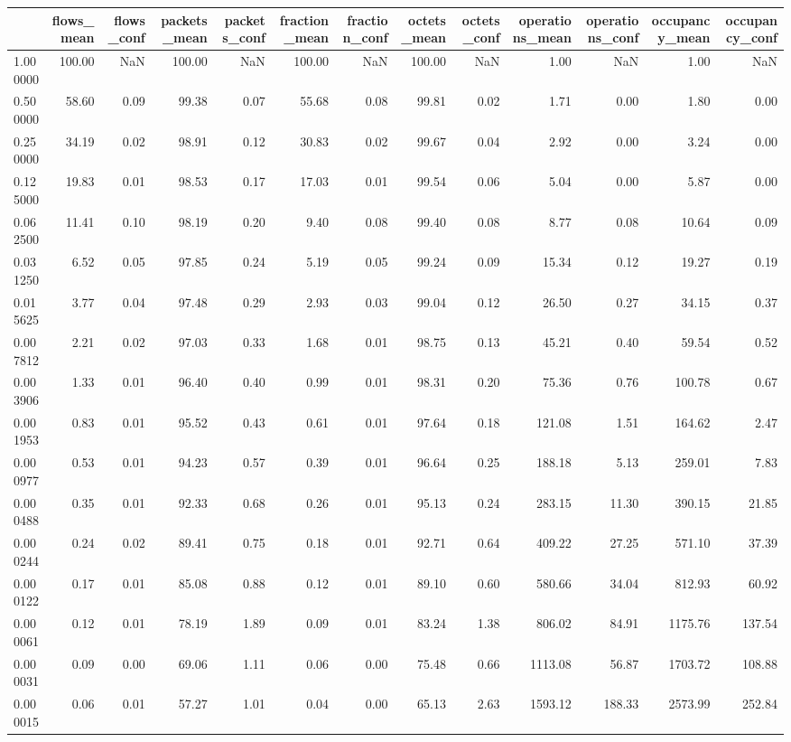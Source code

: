 \begin{tabular}{lrrrrrrrrrrrr}
\toprule
 & flows_mean & flows_conf & packets_mean & packets_conf & fraction_mean & fraction_conf & octets_mean & octets_conf & operations_mean & operations_conf & occupancy_mean & occupancy_conf \\
\midrule
1.000000 & 100.00 & NaN & 100.00 & NaN & 100.00 & NaN & 100.00 & NaN & 1.00 & NaN & 1.00 & NaN \\
0.500000 & 58.60 & 0.09 & 99.38 & 0.07 & 55.68 & 0.08 & 99.81 & 0.02 & 1.71 & 0.00 & 1.80 & 0.00 \\
0.250000 & 34.19 & 0.02 & 98.91 & 0.12 & 30.83 & 0.02 & 99.67 & 0.04 & 2.92 & 0.00 & 3.24 & 0.00 \\
0.125000 & 19.83 & 0.01 & 98.53 & 0.17 & 17.03 & 0.01 & 99.54 & 0.06 & 5.04 & 0.00 & 5.87 & 0.00 \\
0.062500 & 11.41 & 0.10 & 98.19 & 0.20 & 9.40 & 0.08 & 99.40 & 0.08 & 8.77 & 0.08 & 10.64 & 0.09 \\
0.031250 & 6.52 & 0.05 & 97.85 & 0.24 & 5.19 & 0.05 & 99.24 & 0.09 & 15.34 & 0.12 & 19.27 & 0.19 \\
0.015625 & 3.77 & 0.04 & 97.48 & 0.29 & 2.93 & 0.03 & 99.04 & 0.12 & 26.50 & 0.27 & 34.15 & 0.37 \\
0.007812 & 2.21 & 0.02 & 97.03 & 0.33 & 1.68 & 0.01 & 98.75 & 0.13 & 45.21 & 0.40 & 59.54 & 0.52 \\
0.003906 & 1.33 & 0.01 & 96.40 & 0.40 & 0.99 & 0.01 & 98.31 & 0.20 & 75.36 & 0.76 & 100.78 & 0.67 \\
0.001953 & 0.83 & 0.01 & 95.52 & 0.43 & 0.61 & 0.01 & 97.64 & 0.18 & 121.08 & 1.51 & 164.62 & 2.47 \\
0.000977 & 0.53 & 0.01 & 94.23 & 0.57 & 0.39 & 0.01 & 96.64 & 0.25 & 188.18 & 5.13 & 259.01 & 7.83 \\
0.000488 & 0.35 & 0.01 & 92.33 & 0.68 & 0.26 & 0.01 & 95.13 & 0.24 & 283.15 & 11.30 & 390.15 & 21.85 \\
0.000244 & 0.24 & 0.02 & 89.41 & 0.75 & 0.18 & 0.01 & 92.71 & 0.64 & 409.22 & 27.25 & 571.10 & 37.39 \\
0.000122 & 0.17 & 0.01 & 85.08 & 0.88 & 0.12 & 0.01 & 89.10 & 0.60 & 580.66 & 34.04 & 812.93 & 60.92 \\
0.000061 & 0.12 & 0.01 & 78.19 & 1.89 & 0.09 & 0.01 & 83.24 & 1.38 & 806.02 & 84.91 & 1175.76 & 137.54 \\
0.000031 & 0.09 & 0.00 & 69.06 & 1.11 & 0.06 & 0.00 & 75.48 & 0.66 & 1113.08 & 56.87 & 1703.72 & 108.88 \\
0.000015 & 0.06 & 0.01 & 57.27 & 1.01 & 0.04 & 0.00 & 65.13 & 2.63 & 1593.12 & 188.33 & 2573.99 & 252.84 \\

\end{tabular}
